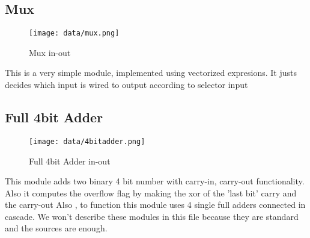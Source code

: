 \subsection*{Mux}
\begin{figure}[H]
  \begin{centering}
  \texttt{[image: data/mux.png]}
  \par\end{centering}
  \caption{Mux in-out}
\end{figure}

This is a very simple module, implemented using vectorized expresions. It justs decides which input is wired to output according to selector input

\subsection*{Full 4bit Adder}

\begin{figure}[H]
  \begin{centering}
  \texttt{[image: data/4bitadder.png]}
  \par\end{centering}
  \caption{Full 4bit Adder in-out}
\end{figure}

This module adds two binary 4 bit number with carry-in, carry-out functionality. Also it computes the overflow flag by making the xor of the 'last bit' carry and the carry-out
Also , to function this module uses 4 single full adders connected in 	
cascade. We won't describe these modules in this file because they are standard and the sources are enough.



